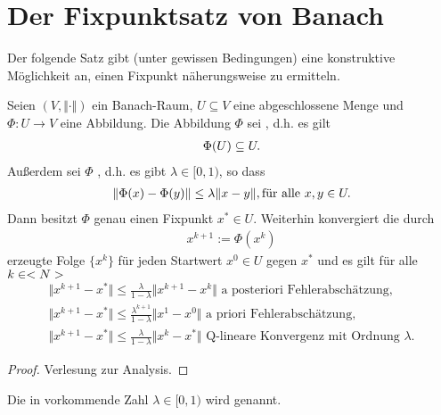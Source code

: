 \section{Der Fixpunktsatz von Banach}

Der folgende Satz gibt (unter gewissen Bedingungen) eine konstruktive Möglichkeit an, einen Fixpunkt näherungsweise zu ermitteln.

\begin{proposition}[Banach]
	Seien $(V, \Vert \cdot \Vert)$ ein Banach-Raum, $U \subseteq V$ eine abgeschlossene Menge und $\Phi: U \to V$ eine Abbildung. Die Abbildung $\Phi$ sei , d.h. es gilt
	\begin{align}
	\Phi(U) \subseteq U.\notag
	\end{align}
	Außerdem sei $\Phi$ , d.h. es gibt $\lambda \in [0,1)$, so dass
	\begin{align}
	\Vert\Phi(x) - \Phi(y)\Vert \le \lambda \Vert x-y\Vert, \text{für alle } x,y \in U.\notag
	\end{align}
	Dann besitzt $\Phi$ genau einen Fixpunkt $x^{*} \in U$. Weiterhin konvergiert die durch
	\begin{align}
	x^{k+1} := \Phi(x^k) \label{eq_1_1_1}
	\end{align}
	erzeugte Folge $\{x^k\}$ für jeden Startwert $x^0 \in U$ gegen $x^{*}$ und es gilt für alle $k \in <N>$
	\begin{align}
	\Vert x^{k+1} - x^{*}\Vert \le \frac{\lambda}{1 - \lambda}\Vert x^{k+1} - x^k\Vert \text{ a posteriori Fehlerabschätzung}, \label{eq_1_2_2}\\
	\Vert x^{k+1} - x^{*}\Vert \le \frac{\lambda^{k+1}}{1 - \lambda}\Vert x^1 - x^0\Vert \text{ a priori Fehlerabschätzung},\label{eq_1_2_3_}\\
	\Vert x^{k+1} - x^{*}\Vert \le \frac{\lambda}{1 - \lambda}\Vert x^{k} - x^{*}\Vert \text{ Q-lineare Konvergenz mit Ordnung }\lambda. \label{eq_1_2_4}
	\end{align}
\end{proposition}

\begin{proof}
	Verlesung zur Analysis.
\end{proof}

Die in  vorkommende Zahl $\lambda \in [0,1)$ wird  genannt. 
